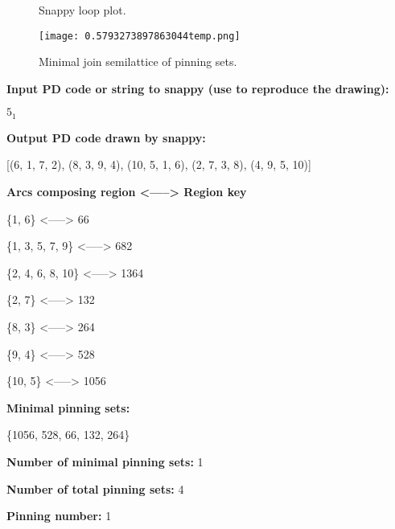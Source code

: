 \documentclass{article}%
\begin{document}
\begin{multicols}{2}
\begin{figure}[H]
\centering

\caption{Snappy loop plot.}
\label{fig:0.7534155939227717temp.svg}
\end{figure}\columnbreak

\begin{figure}[H]
\centering
\texttt{[image: 0.5793273897863044temp.png]}
\caption{Minimal join semilattice of pinning sets.}
\label{fig:0.5793273897863044temp.png}
\end{figure}\end{multicols}\newpage\begin{multicols}{2}
\textbf{Input PD code or string to snappy (use to reproduce the drawing):}

	$5_1$

\textbf{Output PD code drawn by snappy:}

	[(6, 1, 7, 2), (8, 3, 9, 4), (10, 5, 1, 6), (2, 7, 3, 8), (4, 9, 5, 10)]


\textbf{Arcs composing region <-----> Region key}

\{{1, 6}\} <-----> 66

\{{1, 3, 5, 7, 9}\} <-----> 682

\{{2, 4, 6, 8, 10}\} <-----> 1364

\{{2, 7}\} <-----> 132

\{{8, 3}\} <-----> 264

\{{9, 4}\} <-----> 528

\{{10, 5}\} <-----> 1056


\columnbreak

\textbf{Minimal pinning sets:}

\{{1056, 528, 66, 132, 264}\}



\textbf{Number of minimal pinning sets:} 1

\textbf{Number of total pinning sets:} 4

\textbf{Pinning number:} 1


\end{multicols}
\end{document}
